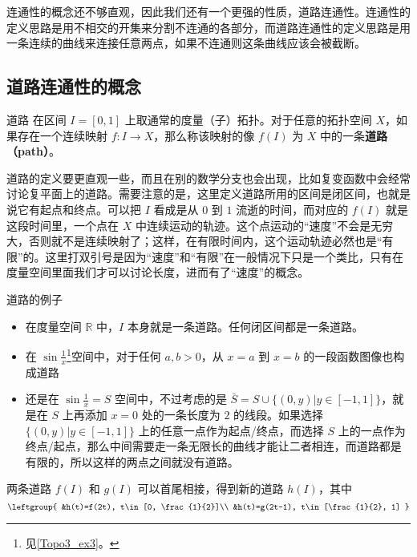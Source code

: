 
连通性的概念还不够直观，因此我们还有一个更强的性质，道路连通性。连通性的定义思路是用不相交的开集来分割不连通的各部分，而道路连通性的定义思路是用一条连续的曲线来连接任意两点，如果不连通则这条曲线应该会被截断。

\subsection{道路连通性的概念}
\begin{definition}{道路}\label{Topo4_def1}
在区间 $I=[0,1]$ 上取通常的度量（子）拓扑。对于任意的拓扑空间 $X$，如果存在一个连续映射 $f: I\rightarrow X$，那么称该映射的像 $f(I)$ 为 $X$ 中的一条\textbf{道路（path）}。
\end{definition}

道路的定义要更直观一些，而且在别的数学分支也会出现，比如复变函数中会经常讨论复平面上的道路。需要注意的是，这里定义道路所用的区间是闭区间，也就是说它有起点和终点。可以把 $I$ 看成是从 $0$ 到 $1$ 流逝的时间，而对应的 $f(I)$ 就是这段时间里，一个点在 $X$ 中连续运动的轨迹。这个点运动的“速度”不会是无穷大，否则就不是连续映射了；这样，在有限时间内，这个运动轨迹必然也是“有限”的。这里打双引号是因为“速度”和“有限”在一般情况下只是一个类比，只有在度量空间里面我们才可以讨论长度，进而有了“速度”的概念。

\begin{example}{道路的例子}\label{Topo4_ex1}
\begin{itemize}
\item 在度量空间 $\mathbb{R}$ 中，$I$ 本身就是一条道路。任何闭区间都是一条道路。
\item 在 $\sin{\frac{1}{x}}$\footnote{见\autoref{Topo3_ex3}。}空间中，对于任何 $a, b>0$，从 $x=a$ 到 $x=b$ 的一段函数图像也构成道路
\item 还是在 $\sin{\frac{1}{x}}=S$ 空间中，不过考虑的是 $\bar{S}=S\cup\{(0, y)|y\in [-1,1]\}$，就是在 $S$ 上再添加 $x=0$ 处的一条长度为 $2$ 的线段。如果选择 $\{(0, y)|y\in [-1,1]\}$ 上的任意一点作为起点/终点，而选择 $S$ 上的一点作为终点/起点，那么中间需要走一条无限长的曲线才能让二者相连，而道路都是有限的，所以这样的两点之间就没有道路。

\end{itemize}
\end{example}

两条道路 $f(I)$ 和 $g(I)$ 可以首尾相接，得到新的道路 $h(I)$，其中
\begin{equation}
\leftgroup{
&h(t)=f(2t), t\in[0, \frac{1}{2}]\\
&h(t)=g(2t-1), t\in[\frac{1}{2}, 1]
}
\end{equation}


